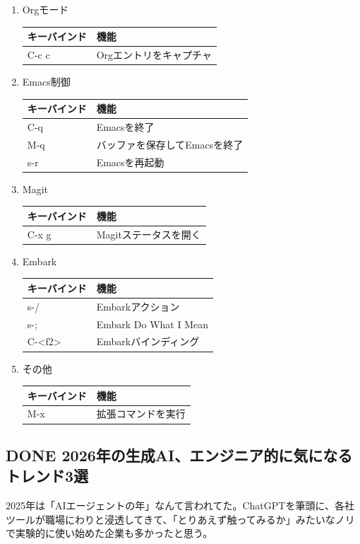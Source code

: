 \documentclass[11pt]{article}
\begin{document}
\begin{enumerate}
\item Orgモード
\label{sec:orgb72509c}
\begin{center}
\begin{tabular}{ll}
キーバインド & 機能\\
\hline
C-c c & Orgエントリをキャプチャ\\
\end{tabular}
\end{center}
\item Emacs制御
\label{sec:org4aed523}
\begin{center}
\begin{tabular}{ll}
キーバインド & 機能\\
\hline
C-q & Emacsを終了\\
M-q & バッファを保存してEmacsを終了\\
s-r & Emacsを再起動\\
\end{tabular}
\end{center}
\item Magit
\label{sec:org8d23764}
\begin{center}
\begin{tabular}{ll}
キーバインド & 機能\\
\hline
C-x g & Magitステータスを開く\\
\end{tabular}
\end{center}
\item Embark
\label{sec:orgdc03265}
\begin{center}
\begin{tabular}{ll}
キーバインド & 機能\\
\hline
s-/ & Embarkアクション\\
s-; & Embark Do What I Mean\\
C-<f2> & Embarkバインディング\\
\end{tabular}
\end{center}
\item その他
\label{sec:orgcfc2308}
\begin{center}
\begin{tabular}{ll}
キーバインド & 機能\\
\hline
M-x & 拡張コマンドを実行\\
\end{tabular}
\end{center}
\end{enumerate}
\subsection{{\bfseries\sffamily DONE} 2026年の生成AI、エンジニア的に気になるトレンド3選}
\label{sec:org210c6b9}
2025年は「AIエージェントの年」なんて言われてた。ChatGPTを筆頭に、各社ツールが職場にわりと浸透してきて、「とりあえず触ってみるか」みたいなノリで実験的に使い始めた企業も多かったと思う。
\end{document}

